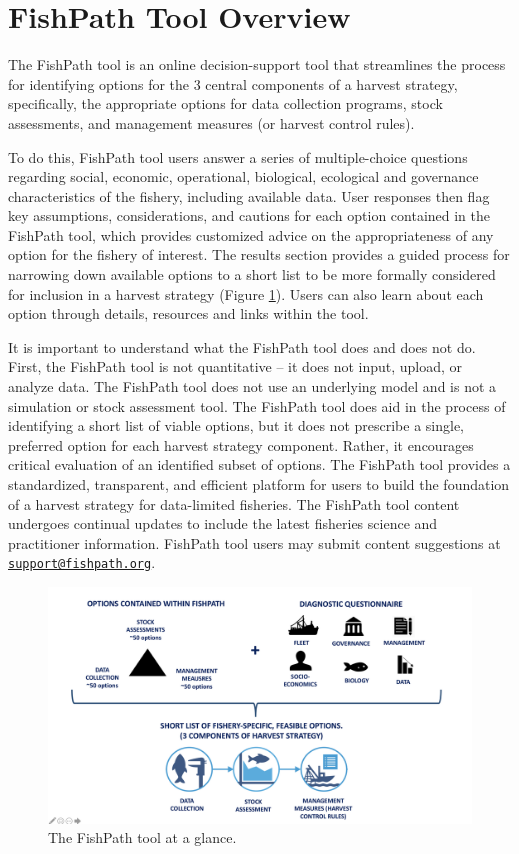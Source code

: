 \documentclass[11pt,]{book}
\begin{document}
\hypertarget{fishpath-tool-overview}{%
\section{FishPath Tool Overview}\label{fishpath-tool-overview}}

The FishPath tool is an online decision-support tool that streamlines the process for identifying options for the 3 central components of a harvest strategy, specifically, the appropriate options for data collection programs, stock assessments, and management measures (or harvest control rules).

To do this, FishPath tool users answer a series of multiple-choice questions regarding social, economic, operational, biological, ecological and governance characteristics of the fishery, including available data. User responses then flag key assumptions, considerations, and cautions for each option contained in the FishPath tool, which provides customized advice on the appropriateness of any option for the fishery of interest. The results section provides a guided process for narrowing down available options to a short list to be more formally considered for inclusion in a harvest strategy (Figure \ref{fig:overview}). Users can also learn about each option through details, resources and links within the tool.

It is important to understand what the FishPath tool does and does not do. First, the FishPath tool is not quantitative -- it does not input, upload, or analyze data. The FishPath tool does not use an underlying model and is not a simulation or stock assessment tool. The FishPath tool does aid in the process of identifying a short list of viable options, but it does not prescribe a single, preferred option for each harvest strategy component. Rather, it encourages critical evaluation of an identified subset of options. The FishPath tool provides a standardized, transparent, and efficient platform for users to build the foundation of a harvest strategy for data-limited fisheries. The FishPath tool content undergoes continual updates to include the latest fisheries science and practitioner information. FishPath tool users may submit content suggestions at \href{mailto:support@fishpath.org}{\nolinkurl{support@fishpath.org}}.

\begin{figure}

{\centering \includegraphics[width=0.75\linewidth]{images/fishpath-tool-overview-diagram} 

}

\caption{The FishPath tool at a glance.}\label{fig:overview}
\end{figure}
\end{document}
